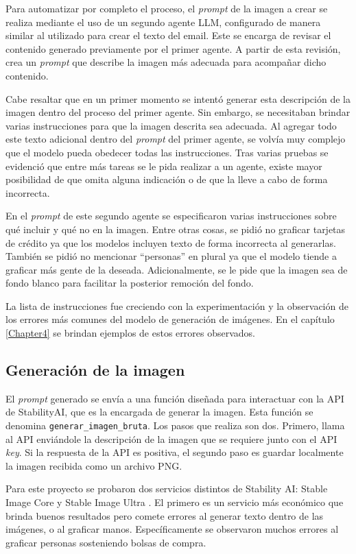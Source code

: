 Para automatizar por completo el proceso, el \textit{prompt} de la imagen a crear se realiza mediante el uso de un segundo agente LLM, configurado de manera similar al utilizado para crear el texto del email. Este se encarga de revisar el contenido generado previamente por el primer agente. A partir de esta revisión, crea un \textit{prompt} que describe la imagen más adecuada para acompañar dicho contenido.

Cabe resaltar que en un primer momento se intentó generar esta descripción de la imagen dentro del proceso del primer agente. Sin embargo, se necesitaban brindar varias instrucciones para que la imagen descrita sea adecuada. Al agregar todo este texto adicional dentro del \textit{prompt} del primer agente, se volvía muy complejo que el modelo pueda obedecer todas las instrucciones. Tras varias pruebas se evidenció que entre más tareas se le pida realizar a un agente, existe mayor posibilidad de que omita alguna indicación o de que la lleve a cabo de forma incorrecta.

En el \textit{prompt} de este segundo agente se especificaron varias instrucciones sobre qué incluir y qué no en la imagen. Entre otras cosas, se pidió no graficar tarjetas de crédito ya que los modelos incluyen texto de forma incorrecta al generarlas. También se pidió no mencionar ``personas'' en plural ya que el modelo tiende a graficar más gente de la deseada. Adicionalmente, se le pide que la imagen sea de fondo blanco para facilitar la posterior remoción del fondo.

La lista de instrucciones fue creciendo con la experimentación y la observación de los errores más comunes del modelo de generación de imágenes. En el capítulo \ref{Chapter4} se brindan ejemplos de estos errores observados.

\subsection{Generación de la imagen}

El \textit{prompt} generado se envía a una función diseñada para interactuar con la API de StabilityAI, que es la encargada de generar la imagen. Esta función se denomina \texttt{generar\_imagen\_bruta}. Los pasos que realiza son dos. Primero, llama al API enviándole la descripción de la imagen que se requiere junto con el API \textit{key}. Si la respuesta de la API es positiva, el segundo paso es guardar localmente la imagen recibida como un archivo PNG.

Para este proyecto se probaron dos servicios distintos de Stability AI: Stable Image Core \cite{stabilityai2023stable} y Stable Image Ultra \cite{stabilityai2023ultra}. El primero es un servicio más económico que brinda buenos resultados pero comete errores al generar texto dentro de las imágenes, o al graficar manos. Específicamente se observaron muchos errores al graficar personas sosteniendo bolsas de compra.


